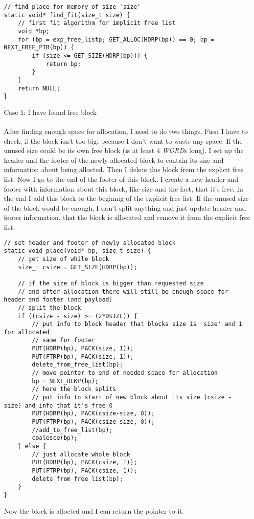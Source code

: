 \documentclass[a4paper]{article}
\begin{document}
\begin{lstlisting}[caption= Finding free block in the explicit free list]
// find place for memory of size 'size'
static void* find_fit(size_t size) {
	// first fit algorithm for implicit free list
	void *bp;
	for (bp = exp_free_listp; GET_ALLOC(HDRP(bp)) == 0; bp = NEXT_FREE_PTR(bp)) {
		if (size <= GET_SIZE(HDRP(bp))) {
			return bp;
		}
	}
	return NULL;
}
\end{lstlisting}

{\large Case 1: I have found free block}\\
\\
After finding enough space for allocation, I need to do two things. First I have to check, if the
block isn't too big, because I don't want to waste any space. 
If the unused size could be 
its own free block (is at least 4 \textit{WORD}s long), I set up the header and the footer 
of the newly allocated
block to contain its size and information about being allocted. 
Then I delete this block from the explicit free list. 
Now I go to the end of the footer of this block. I create
a new header and footer with information about this block, like size and the fact, that it's free.
In the end I add this block to the beginnig of the explicit free list. 
If the unused size of the block would be enough, I don't split anything
and just update header and footer information, that the block is allocated and remove it from
the explicit free list. 
\begin{lstlisting}[caption= {helper function for setting a block as allocated}]
// set header and footer of newly allocated block
static void place(void* bp, size_t size) {
	// get size of while block
	size_t csize = GET_SIZE(HDRP(bp));

	// if the size of block is bigger than requested size
	// and after allocation there will still be enough space for header and footer (and payload)
	// split the block
	if ((csize - size) >= (2*DSIZE)) {
		// put info to block header that blocks size is 'size' and 1 for allocated
		// same for footer
		PUT(HDRP(bp), PACK(size, 1));
		PUT(FTRP(bp), PACK(size, 1));
		delete_from_free_list(bp);
		// move pointer to end of needed space for allocation
		bp = NEXT_BLKP(bp);
		// here the block splits
		// put info to start of new block about its size (csize - size) and info that it's free 0
		PUT(HDRP(bp), PACK(csize-size, 0));
		PUT(FTRP(bp), PACK(csize-size, 0));
		//add_to_free_list(bp);
		coalesce(bp);
	} else {
		// just allocate whole block
		PUT(HDRP(bp), PACK(csize, 1));
		PUT(FTRP(bp), PACK(csize, 1));
		delete_from_free_list(bp);
	}
}
\end{lstlisting}
Now the block is allocted and I can return the pointer to it. \\
\newpage
\end{document}
